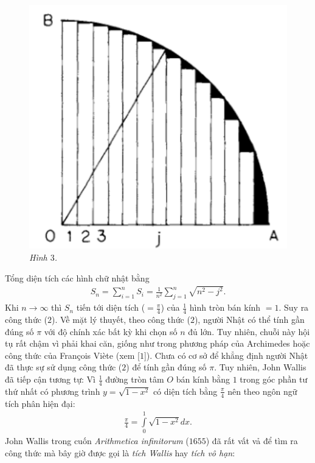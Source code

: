 \begin{multicols}{2}
\begin{figure}[H]
		\includegraphics[width= 1\linewidth]{3}
		\caption{\small\textit{\color{lichsutoanhoc}Hình $3$.}}
		\vspace*{-10pt}
	\end{figure}
	Tổng diện tích các hình chữ nhật bằng 
	\begin{align*}
		{S_n} = \sum\limits_{i = 1}^n {{S_i} = } \frac{1}{{{n^2}}}\sum\limits_{j = 1}^n {\sqrt {{n^2} - {j^2}} }.
	\end{align*}
	Khi $n \to \infty$ thì $S_n$ tiến tới diện tích ($= \frac{\pi}{4}$) của $\frac{1}{4}$ hình tròn bán kính $=1$.  Suy ra công thức ($2$).
	\vskip 0.1cm
	Về mặt lý thuyết, theo công thức ($2$), người Nhật có thể tính gần đúng số $\pi$ với độ chính xác bất kỳ khi chọn số $n$ đủ lớn. Tuy nhiên, chuỗi này hội tụ rất chậm vì phải khai căn, giống như trong phương pháp của Archimedes hoặc công thức của François Viète (xem [$1$]).
	\vskip 0.1cm
	Chưa có cơ sở để khẳng định người Nhật đã thực sự sử dụng công thức ($2$) để tính gần đúng số $\pi$. Tuy nhiên, John Wallis đã tiếp cận tương tự: Vì $\frac{1}{4}$ đường tròn tâm $O$ bán kính bằng $1$ trong góc phần tư thứ nhất có phương trình $y = \sqrt{1- x^2}$ có diện tích bằng $\frac{\pi}{4}$ nên theo ngôn ngữ tích phân hiện đại:  
	\begin{align*}
		\frac{\pi }{4} = \int\limits_0^1 {\sqrt {1 - {x^2}} dx} .
	\end{align*}   
	John Wallis trong cuốn \textit{Arithmetica infinitorum} ($1655$) đã rất vất vả để tìm ra công thức mà bây giờ được gọi là \textit{tích Wallis} hay \textit{tích vô hạn}:

\end{multicols}
